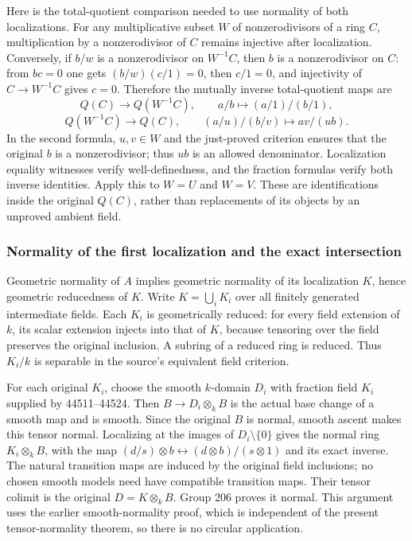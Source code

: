 Here is the total-quotient comparison needed to use normality of both localizations. For any multiplicative subset \(W\) of nonzerodivisors of a ring \(C\), multiplication by a nonzerodivisor of \(C\) remains injective after localization. Conversely, if \(b/w\) is a nonzerodivisor on \(W^{-1}C\), then \(b\) is a nonzerodivisor on \(C\): from \(bc=0\) one gets \((b/w)(c/1)=0\), then \(c/1=0\), and injectivity of \(C\to W^{-1}C\) gives \(c=0\). Therefore the mutually inverse total-quotient maps are \[
 Q(C)\longrightarrow Q(W^{-1}C),\qquad
 a/b\longmapsto(a/1)/(b/1),
\] \[
 Q(W^{-1}C)\longrightarrow Q(C),\qquad
 (a/u)/(b/v)\longmapsto av/(ub).
\] In the second formula, \(u,v\in W\) and the just-proved criterion ensures that the original \(b\) is a nonzerodivisor; thus \(ub\) is an allowed denominator. Localization equality witnesses verify well-definedness, and the fraction formulas verify both inverse identities. Apply this to \(W=U\) and \(W=V\). These are identifications inside the original \(Q(C)\), rather than replacements of its objects by an unproved ambient field.

\subsubsection{Normality of the first localization and the exact intersection}\label{normality-of-the-first-localization-and-the-exact-intersection}

Geometric normality of \(A\) implies geometric normality of its localization \(K\), hence geometric reducedness of \(K\). Write \(K=\bigcup_iK_i\) over all finitely generated intermediate fields. Each \(K_i\) is geometrically reduced: for every field extension of \(k\), its scalar extension injects into that of \(K\), because tensoring over the field preserves the original inclusion. A subring of a reduced ring is reduced. Thus \(K_i/k\) is separable in the source's equivalent field criterion.

For each original \(K_i\), choose the smooth \(k\)-domain \(D_i\) with fraction field \(K_i\) supplied by 44511--44524. Then \(B\to D_i\otimes_kB\) is the actual base change of a smooth map and is smooth. Since the original \(B\) is normal, smooth ascent makes this tensor normal. Localizing at the images of \(D_i\setminus\{0\}\) gives the normal ring \(K_i\otimes_kB\), with the map \((d/s)\otimes b\leftrightarrow(d\otimes b)/(s\otimes1)\) and its exact inverse. The natural transition maps are induced by the original field inclusions; no chosen smooth models need have compatible transition maps. Their tensor colimit is the original \(D=K\otimes_kB\). Group 206 proves it normal. This argument uses the earlier smooth-normality proof, which is independent of the present tensor-normality theorem, so there is no circular application.

